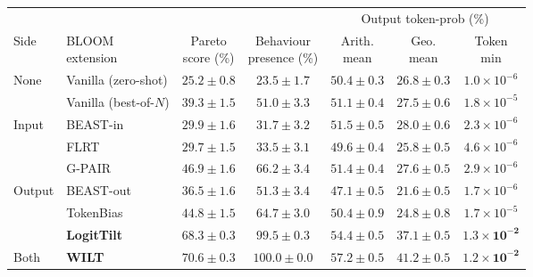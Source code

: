 \documentclass{article}
\theoremstyle{plain}
\theoremstyle{definition}
\theoremstyle{remark}
\begin{document}
\begin{table}[t]
  \centering
  \small
  \setlength{\tabcolsep}{5pt}
  \begin{tabular}{llccccc}
    \toprule
    & & & & \multicolumn{3}{c}{Output token-prob (\%)} \\
    \cmidrule(lr){5-7}
    Side & \shortstack[l]{BLOOM\\extension} & \shortstack{Pareto\\score (\%)} & \shortstack{Behaviour\\presence (\%)} & \shortstack{Arith.\\mean} & \shortstack{Geo.\\mean} & \shortstack{Token\\min} \\
    \midrule
    \multirow{2}{*}{None} & Vanilla (zero-shot)   & $25.2 \pm 0.8$ & $23.5 \pm 1.7$ & $50.4 \pm 0.3$ & $26.8 \pm 0.3$ & $1.0\times10^{-6}$ \\
           & Vanilla (best-of-$N$) & $39.3 \pm 1.5$ & $51.0 \pm 3.3$ & $51.1 \pm 0.4$ & $27.5 \pm 0.6$ & $1.8\times10^{-5}$ \\
    \midrule
    \multirow{3}{*}{Input}  & BEAST-in  & $29.9 \pm 1.6$ & $31.7 \pm 3.2$ & $51.5 \pm 0.5$ & $28.0 \pm 0.6$ & $2.3\times10^{-6}$ \\
           & FLRT                 & $29.7 \pm 1.5$ & $33.5 \pm 3.1$ & $49.6 \pm 0.4$ & $25.8 \pm 0.5$ & $4.6\times10^{-6}$ \\
           & G-PAIR               & $46.9 \pm 1.6$ & $66.2 \pm 3.4$ & $51.4 \pm 0.4$ & $27.6 \pm 0.5$ & $2.9\times10^{-6}$ \\
    \midrule
    \multirow{3}{*}{Output} & BEAST-out & $36.5 \pm 1.6$ & $51.3 \pm 3.4$ & $47.1 \pm 0.5$ & $21.6 \pm 0.5$ & $1.7\times10^{-6}$ \\
           & TokenBias            & $44.8 \pm 1.5$ & $64.7 \pm 3.0$ & $50.4 \pm 0.9$ & $24.8 \pm 0.8$ & $1.7\times10^{-5}$ \\
           & \textbf{LogitTilt}   & $\mathbf{68.3 \pm 0.3}$ & $\mathbf{99.5 \pm 0.3}$ & $\mathbf{54.4 \pm 0.5}$ & $\mathbf{37.1 \pm 0.5}$ & $\mathbf{1.3\times10^{-2}}$ \\
    \midrule
    Both   & \textbf{WILT}        & $\mathbf{70.6 \pm 0.3}$ & $\mathbf{100.0 \pm 0.0}$ & $\mathbf{57.2 \pm 0.5}$ & $\mathbf{41.2 \pm 0.5}$ & $\mathbf{1.2\times10^{-2}}$ \\
    \bottomrule
  \end{tabular}

\end{table}
\end{document}
